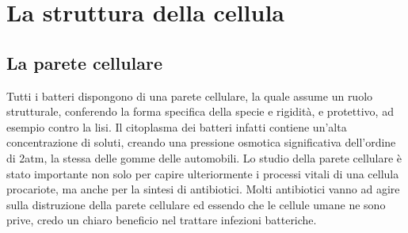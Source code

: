 \chapter{La struttura della cellula}
\section{La parete cellulare}
Tutti i batteri dispongono di una parete cellulare, la quale assume un ruolo strutturale, conferendo la forma specifica della specie e rigidità, e 
protettivo, ad esempio contro la lisi. Il citoplasma dei batteri infatti contiene un’alta concentrazione di soluti, creando una pressione osmotica 
significativa dell’ordine di 2atm, la stessa delle gomme delle automobili. Lo studio della parete cellulare è stato importante non solo per capire 
ulteriormente i processi vitali di una cellula procariote, ma anche per la sintesi di antibiotici. Molti antibiotici vanno ad agire sulla distruzione della 
parete cellulare ed essendo che le cellule umane ne sono prive, credo un chiaro beneficio nel trattare infezioni batteriche.
